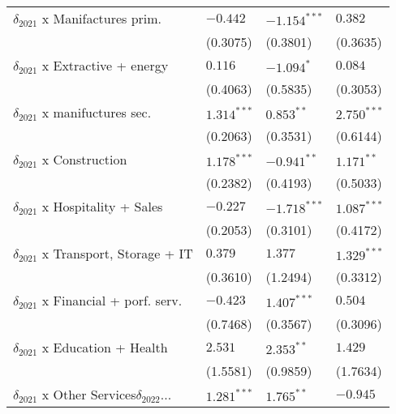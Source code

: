 \begin{tabular}{llll}
$\delta_{2021}$ x Manifactures prim.               &           $-0.442$ &     $-1.154^{***}$ &            $0.382$ \\
                                                   &           (0.3075) &           (0.3801) &           (0.3635) \\
$\delta_{2021}$ x Extractive + energy              &            $0.116$ &         $-1.094^*$ &            $0.084$ \\
                                                   &           (0.4063) &           (0.5835) &           (0.3053) \\
$\delta_{2021}$ x manifuctures sec.                &      $1.314^{***}$ &       $0.853^{**}$ &      $2.750^{***}$ \\
                                                   &           (0.2063) &           (0.3531) &           (0.6144) \\
$\delta_{2021}$ x Construction                     &      $1.178^{***}$ &      $-0.941^{**}$ &       $1.171^{**}$ \\
                                                   &           (0.2382) &           (0.4193) &           (0.5033) \\
$\delta_{2021}$ x Hospitality + Sales              &           $-0.227$ &     $-1.718^{***}$ &      $1.087^{***}$ \\
                                                   &           (0.2053) &           (0.3101) &           (0.4172) \\
$\delta_{2021}$ x Transport, Storage + IT          &            $0.379$ &            $1.377$ &      $1.329^{***}$ \\
                                                   &           (0.3610) &           (1.2494) &           (0.3312) \\
$\delta_{2021}$ x Financial + porf. serv.          &           $-0.423$ &      $1.407^{***}$ &            $0.504$ \\
                                                   &           (0.7468) &           (0.3567) &           (0.3096) \\
$\delta_{2021}$ x Education + Health               &            $2.531$ &       $2.353^{**}$ &            $1.429$ \\
                                                   &           (1.5581) &           (0.9859) &           (1.7634) \\
$\delta_{2021}$ x Other Services$\delta_{2022}$... &      $1.281^{***}$ &       $1.765^{**}$ &           $-0.945$ \\

\end{tabular}

